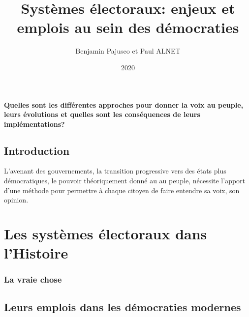 \documentclass[11pt,a4paper]{report}
\author{Benjamin Pajusco et Paul ALNET}
\title{Systèmes électoraux: enjeux et  emplois au sein des démocraties}
\date{2020}
\begin{document}
	
\maketitle

\textbf{Quelles sont les différentes approches pour donner la voix au peuple, leurs évolutions et quelles sont les conséquences de leurs implémentations?}

\section*{Introduction}
 L'avenant des gouvernements, la transition progressive vers des états plus démocratiques, le pouvoir théoriquement donné au au peuple, nécessite l'apport d'une méthode pour permettre à chaque citoyen de faire entendre sa voix, son opinion. 
 
 \nocite{wiki:demo}

\tableofcontents

\chapter{Les systèmes électoraux dans l'Histoire}
\subsection{La vraie chose}


\section{Leurs emplois dans les démocraties modernes}

\newpage

 

\end{document}
